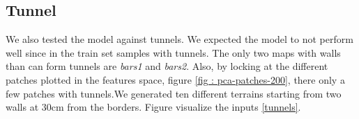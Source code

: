 \documentclass[../document.tex]{subfiles}
\begin{document}
    
\subsection{Tunnel}
We also tested the model against tunnels. We expected the model to not perform well since in the train set samples with tunnels. The only two maps with walls than can form tunnels are \emph{bars1} and \emph{bars2}. Also, by locking at the different patches plotted in the features space, figure \ref{fig : pca-patches-200}, there only a few patches with tunnels.We generated ten different terrains starting from two walls at $30$cm from the borders. Figure visualize the inputs \ref{tunnels}. 
\end{document}
